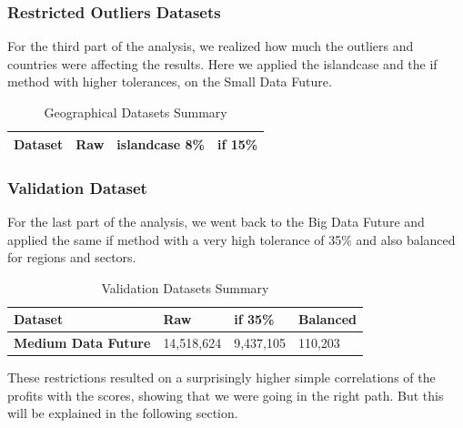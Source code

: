 \documentclass[11pt,english,a4paper,hidelinks]{book}
\begin{document}
\subsubsection{Restricted Outliers Datasets}
\noindent For the third part of the analysis, we realized how much the outliers and countries were affecting the results. Here we applied the \acrshort{islandcase} and the \acrshort{if} method with higher tolerances, on the Small Data Future.

\begin{table}[H]
    \centering
    \begin{tabular}{|l|l|l|l|}
        \hline  
        \textbf{Dataset} & \textbf{Raw} & \textbf{ \acrshort{islandcase} 8\%} & \textbf{ \acrshort{if} 15\%} \\

        \hline
        \end{tabular}

    \caption{Geographical Datasets Summary}
    \label{tab:geographical_datasets_summary}
\end{table}

\subsubsection{Validation Dataset}

\noindent For the last part of the analysis, we went back to the Big Data Future and applied the same if method with a very high tolerance of 35\% and also balanced for regions and sectors.

\begin{table}[H]
    \centering
    \begin{tabular}{|l|l|l|l|}
        \hline  
        \textbf{Dataset} & \textbf{Raw} & \textbf{ \acrshort{if} 35\%} & \textbf{{Balanced}} \\
        \hline
        \textbf{Medium Data Future} & 14,518,624 & 9,437,105 & 110,203 \\
        \hline
        \end{tabular}

    \caption{Validation Datasets Summary}
    \label{tab:validation_datasets_summary}
\end{table}

\noindent These restrictions resulted on a surprisingly higher simple correlations of the profits with the scores, showing that we were going in the right path. But this will be explained in the following section.
\end{document}
